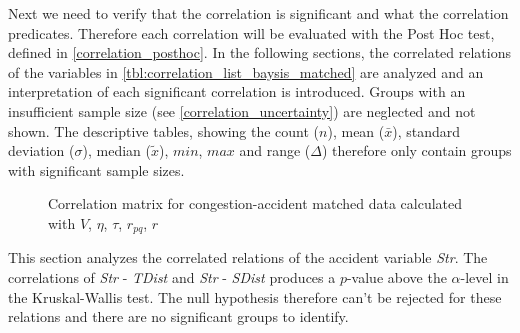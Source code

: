Next we need to verify that the correlation is significant and what the correlation predicates. Therefore each correlation will be evaluated with the Post Hoc test, defined in \cref{correlation_posthoc}. In the following sections, the correlated relations of the variables in \cref{tbl:correlation_list_baysis_matched} are analyzed and an interpretation of each significant correlation is introduced. Groups with an insufficient sample size (see \cref{correlation_uncertainty}) are neglected and not shown. The descriptive tables, showing the count ($n$), mean ($\bar{x}$), standard deviation ($\sigma$), median ($\tilde{x}$), $min$, $max$ and range ($\Delta$) therefore only contain groups with significant sample sizes.
\begin{figure}[!ht]
	\centering
	\caption{Correlation matrix for congestion-accident matched data calculated with $V$, $\eta$, $\tau$, $r_{pq}$, $r$}
	\label{img:correlation_matrix_matched_cramers}
\end{figure}

This section analyzes the correlated relations of the accident variable \textit{Str}. The correlations of \textit{Str} - \textit{TDist} and \textit{Str} - \textit{SDist} produces a $p$-value above the $\alpha$-level in the Kruskal-Wallis test. The null hypothesis therefore can't be rejected for these relations and there are no significant groups to identify.

